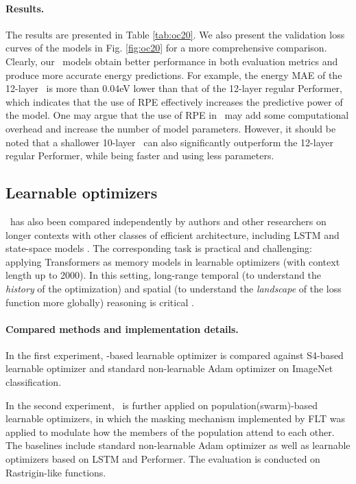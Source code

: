 \paragraph{Results.}
The results are presented in Table \ref{tab:oc20}. We also present the validation loss curves of the models in Fig. \ref{fig:oc20} for a more comprehensive comparison. 
Clearly, our \FLT~models obtain better performance in both evaluation metrics and produce more accurate energy predictions. For example, the energy MAE of the 12-layer \FLT~is more than 0.04eV lower than that of the 12-layer regular Performer, which indicates that the use of RPE effectively increases the predictive power of the model. One may argue that the use of RPE in \FLT~may add some computational overhead and increase the number of model parameters. However, it should be noted that a shallower 10-layer \FLT~can also significantly outperform the 12-layer regular Performer, while being faster and using less parameters. 

\subsection{Learnable optimizers}
\label{sec:mnemosyne}

\FLT~has also been compared independently by authors and other researchers on longer contexts with other classes of efficient architecture, including LSTM \cite{hochreiter1997long} and state-space models \cite{s4}. 
The corresponding task is practical and challenging: applying Transformers as memory models in learnable optimizers (with context length up to 2000). 
In this setting, long-range temporal (to understand the \textit{history} of the optimization) and spatial (to understand the \textit{landscape} of the loss function more globally) reasoning is critical \cite{jain2023mnemosyne,gartner2023transformer}. 

\paragraph{Compared methods and implementation details.}
In the first experiment, \FLT-based learnable optimizer is compared against S4-based learnable optimizer \cite{s4} and standard non-learnable Adam optimizer on ImageNet classification.

In the second experiment, \FLT~is further applied on population(swarm)-based learnable optimizers, in which the masking mechanism implemented by FLT was applied to modulate how the members of the population attend to each other. The baselines include standard non-learnable Adam optimizer as well as learnable optimizers based on LSTM and Performer. The evaluation is conducted on Rastrigin-like functions. 

